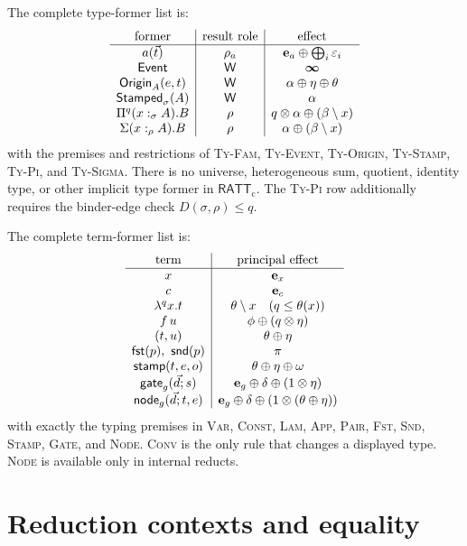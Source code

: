 \documentclass[11pt]{article}
\numberwithin{equation}{section}
\theoremstyle{definition}
\theoremstyle{plain}
\theoremstyle{remark}
\newcommand{\RATT}{\mathsf{RATT}_{\mathrm c}}
\newcommand{\Event}{\mathsf{Event}}
\newcommand{\Origin}{\mathsf{Origin}}
\newcommand{\Stamped}{\mathsf{Stamped}}
\newcommand{\Wit}{\mathsf W}
\newcommand{\eps}{\varepsilon}
\newcommand{\unit}{\mathbf e}
\newcommand{\absent}{\boldsymbol\infty}
\newcommand{\fst}{\AFFst}
\newcommand{\snd}{\AFSnd}
\begin{document}
The complete type-former list is:
\[
\begin{array}{c|c|c}
\text{former} & \text{result role} & \text{effect}\\
\hline
a(\vec t) & \rho_a & \unit_a\oplus\bigoplus_i\eps_i\\
\Event & \Wit & \absent\\
\Origin_A(e,t) & \Wit & \alpha\oplus\eta\oplus\theta\\
\Stamped_\sigma(A) & \Wit & \alpha\\
\AFDepFun^q(x:_{\sigma}A).B & \rho &
 q\otimes\alpha\oplus(\beta\setminus x)\\
\AFDepPair(x:_{\rho}A).B & \rho &
 \alpha\oplus(\beta\setminus x)
\end{array}
\]
with the premises and restrictions of
\textsc{Ty-Fam}, \textsc{Ty-Event}, \textsc{Ty-Origin},
\textsc{Ty-Stamp}, \textsc{Ty-Pi}, and \textsc{Ty-Sigma}.  There is no
universe, heterogeneous sum, quotient, identity type, or other implicit type
former in \(\RATT\).  The \textsc{Ty-Pi} row additionally requires the
binder-edge check \(D(\sigma,\rho)\le q\).

The complete term-former list is:
\[
\begin{array}{c|c}
\text{term} & \text{principal effect}\\
\hline
x & \unit_x\\
c & \unit_c\\
\lambda^q x.t & \theta\setminus x\quad(q\le\theta(x))\\
f\,u & \phi\oplus(q\otimes\eta)\\
(t,u) & \theta\oplus\eta\\
\fst(p),\ \snd(p) & \pi\\
\mathsf{stamp}(t,e,o) & \theta\oplus\eta\oplus\omega\\
\mathsf{gate}_g(\vec d;s) &
 \unit_g\oplus\delta\oplus(1\otimes\eta)\\
\mathsf{node}_g(\vec d;t,e) &
 \unit_g\oplus\delta\oplus(1\otimes(\theta\oplus\eta))
\end{array}
\]
with exactly the typing premises in \textsc{Var}, \textsc{Const},
\textsc{Lam}, \textsc{App}, \textsc{Pair}, \textsc{Fst}, \textsc{Snd},
\textsc{Stamp}, \textsc{Gate}, and \textsc{Node}.  \textsc{Conv} is the only
rule that changes a displayed type.  \textsc{Node} is available only in
internal reducts.

\section{Reduction contexts and equality}\label{app:reduction}
\end{document}
